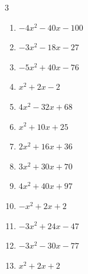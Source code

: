 \begin{multicols}{3}
\begin{enumerate}
\columnbreak %

\resetques

  \item $-4x^{2}-40x-100$


  \item $-3x^{2}-18x-27$


  \item $-5x^{2}+40x-76$


  \item $x^{2}+2x-2$


  \item $4x^{2}-32x+68$


  \item $x^{2}+10x+25$


  \item $2x^{2}+16x+36$


  \item $3x^{2}+30x+70$


  \item $4x^{2}+40x+97$


  \item $-x^{2}+2x+2$


\columnbreak %

  \item $-3x^{2}+24x-47$


  \item $-3x^{2}-30x-77$


  \item $x^{2}+2x+2$



\end{enumerate}
\end{multicols}
